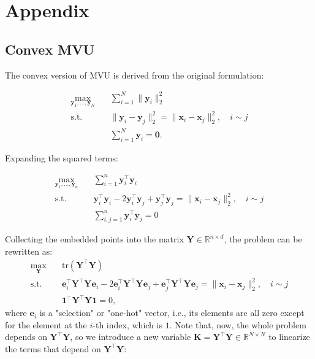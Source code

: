 \chapter{Appendix}
\label{chapter:appendix}

\section{Convex MVU}\label{app:convex-mvu}
The convex version of MVU is derived from the original formulation:

\begin{align}
\max_{\boldsymbol{y}_{1},\dotsc,\boldsymbol{y}_{N}} \quad & \sum_{i=1}^{N}\|\boldsymbol{y}_{i}\|_{2}^{2}\\
\textrm{s.t.} \quad & \|\boldsymbol{y}_{i}-\boldsymbol{y}_{j}\|_{2}^{2}=\|\boldsymbol{x}_{i}-\boldsymbol{x}_{j}\|_{2}^{2},\quad i\sim j\label{eq-app:mvu-isometry-orig}\\
\quad & \sum_{i=1}^{N}\boldsymbol{y}_{i}=\boldsymbol{0}\label{eq-app:mvu-zerocenter}.
\end{align}

Expanding the squared terms:

\begin{align}
\max_{\boldsymbol{y}_{1},\dotsc,\boldsymbol{y}_{n}} \quad & \sum_{i=1}^{n}\boldsymbol{y}_{i}^{\top}\boldsymbol{y}_{i}\\
\textrm{s.t.} \quad & \boldsymbol{y}_{i}^{\top}\boldsymbol{y}_{i} - 2 \boldsymbol{y}_{i}^{\top}\boldsymbol{y}_{j} + \boldsymbol{y}_{j}^{\top}\boldsymbol{y}_{j} =\|\boldsymbol{x}_{i}-\boldsymbol{x}_{j}\|_{2}^{2},\quad i\sim j\\
\quad & \sum_{i,j=1}^{n}\boldsymbol{y}_{i}^{\top}\boldsymbol{y}_{j}=0
\end{align}

Collecting the embedded points into the matrix $\boldsymbol{Y} \in \mathbb{R}^{n \times d}$, the problem can be rewritten as:
\begin{align}
\max_{\boldsymbol{Y}} \quad & \text{tr}(\boldsymbol{Y}^{\top}\boldsymbol{Y})\\
\textrm{s.t.} \quad & \boldsymbol{e}_{i}^{\top}\boldsymbol{Y}^{\top}\boldsymbol{Y}\boldsymbol{e}_{i} - 2 \boldsymbol{e}_{i}^{\top}\boldsymbol{Y}^{\top}\boldsymbol{Y}\boldsymbol{e}_{j} + \boldsymbol{e}_{j}^{\top}\boldsymbol{Y}^{\top}\boldsymbol{Y}\boldsymbol{e}_{j} =\|\boldsymbol{x}_{i}-\boldsymbol{x}_{j}\|_{2}^{2},\quad i\sim j\\
\quad & \boldsymbol{1}^{\top}\boldsymbol{Y}^{\top}\boldsymbol{Y}\boldsymbol{1} = 0,
\end{align}
where $\boldsymbol{e}_i$ is a "selection" or "one-hot" vector, i.e., its elements are all zero except for the element at the $i$-th index, which is $1$. Note that, now, the whole problem depends on $\boldsymbol{Y}^\top\boldsymbol{Y}$, so we introduce a new variable $\boldsymbol{K}=\boldsymbol{Y}^{\top}\boldsymbol{Y}\in\mathbb{R}^{N\times N}$ to linearize the terms that depend on $\boldsymbol{Y}^\top\boldsymbol{Y}$:

